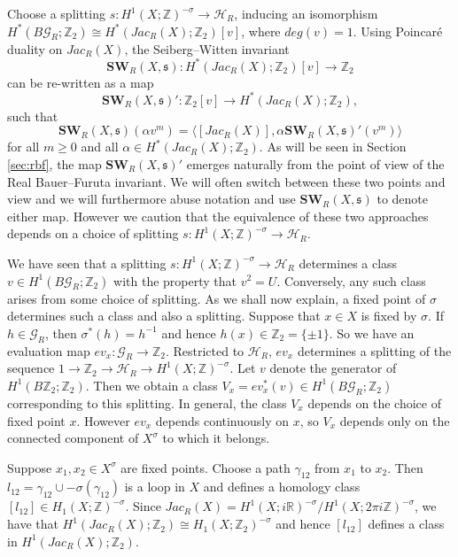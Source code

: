 \documentclass{amsart}
\theoremstyle{definition}
\theoremstyle{remark}
\numberwithin{equation}{section}
\begin{document}
Choose a splitting $s : H^1(X ; \mathbb{Z})^{-\sigma} \to \mathcal{H}_R$, inducing an isomorphism $H^*( B \mathcal{G}_R ; \mathbb{Z}_2) \cong H^*(Jac_R(X) ; \mathbb{Z}_2)[v]$, where $deg(v) = 1$. Using Poincar\'e duality on $Jac_R(X)$, the Seiberg--Witten invariant
\[
\mathbf{SW}_R(X,\mathfrak{s}) : H^*(Jac_R(X) ; \mathbb{Z}_2)[v] \to \mathbb{Z}_2
\]
can be re-written as a map
\[
\mathbf{SW}_R(X , \mathfrak{s})' : \mathbb{Z}_2[v] \to H^*(Jac_R(X) ; \mathbb{Z}_2),
\]
such that
\[
\mathbf{SW}_R(X,\mathfrak{s})( \alpha v^m ) = \langle [Jac_R(X)] , \alpha \mathbf{SW}_R(X,\mathfrak{s})'( v^m) \rangle
\]
for all $m \ge 0$ and all $\alpha \in H^*( Jac_R(X) ; \mathbb{Z}_2)$. As will be seen in Section \ref{sec:rbf}, the map $\mathbf{SW}_R(X,\mathfrak{s})'$ emerges naturally from the point of view of the Real Bauer--Furuta invariant. We will often switch between these two points and view and we will furthermore abuse notation and use $\mathbf{SW}_R(X,\mathfrak{s})$ to denote either map. However we caution that the equivalence of these two approaches depends on a choice of splitting $s : H^1(X ; \mathbb{Z})^{-\sigma} \to \mathcal{H}_R$.

We have seen that a splitting $s : H^1(X ; \mathbb{Z})^{-\sigma} \to \mathcal{H}_R$ determines a class $v \in H^1( B\mathcal{G}_R ; \mathbb{Z}_2)$ with the property that $v^2 = U$. Conversely, any such class arises from some choice of splitting. As we shall now explain, a fixed point of $\sigma$ determines such a class and also a splitting. Suppose that $x \in X$ is fixed by $\sigma$. If $h \in \mathcal{G}_R$, then $\sigma^*(h) = h^{-1}$ and hence $h(x) \in \mathbb{Z}_2 = \{ \pm 1\}$. So we have an evaluation map $ev_x : \mathcal{G}_R \to \mathbb{Z}_2$. Restricted to $\mathcal{H}_R$, $ev_x$ determines a splitting of the sequence $1 \to \mathbb{Z}_2 \to \mathcal{H}_R \to H^1(X ; \mathbb{Z})^{-\sigma}$. Let $v$ denote the generator of $H^1(B\mathbb{Z}_2 ; \mathbb{Z}_2)$. Then we obtain a class $V_x = ev_x^*(v) \in H^1( B\mathcal{G}_R ; \mathbb{Z}_2)$ corresponding to this splitting. In general, the class $V_x$ depends on the choice of fixed point $x$. However $ev_x$ depends continuously on $x$, so $V_x$ depends only on the connected component of $X^\sigma$ to which it belongs. 

Suppose $x_1,x_2 \in X^\sigma$ are fixed points. Choose a path $\gamma_{12}$ from $x_1$ to $x_2$. Then $l_{12} = \gamma_{12} \cup -\sigma(\gamma_{12})$ is a loop in $X$ and defines a homology class $[l_{12}] \in H_1(X ; \mathbb{Z})^{-\sigma}$. Since $Jac_R(X) = H^1(X ; i\mathbb{R})^{-\sigma}/H^1(X ; 2\pi i\mathbb{Z})^{-\sigma}$, we have that $H^1(Jac_R(X) ; \mathbb{Z}_2) \cong H_1(X ; \mathbb{Z}_2)^{-\sigma}$ and hence $[l_{12}]$ defines a class in $H^1( Jac_R(X) ; \mathbb{Z}_2)$. 
\end{document}
